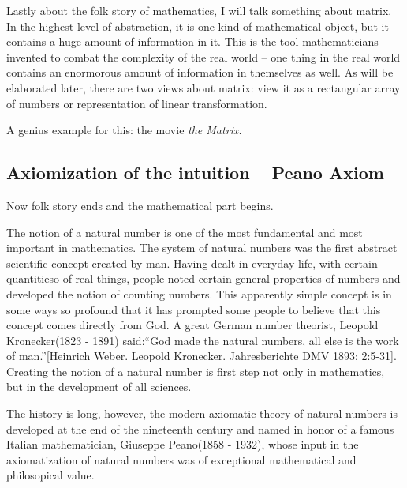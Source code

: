 \documentclass[a4paper]{book}
\begin{document}
    Lastly about the folk story of mathematics, I will talk something
    about matrix. In the highest level of abstraction, it is one kind
    of mathematical object, but it contains a huge amount of
    information in it. This is the tool mathematicians invented to
    combat the complexity of the real world -- one thing in the real
    world contains an enormorous amount of information in themselves as
    well. As will be elaborated later, there are two views about matrix:
    view it as a rectangular array of numbers or representation of
    linear transformation.

    A genius example for this: the movie \textit{the Matrix.}


    \subsection{Axiomization of the intuition -- Peano Axiom}

    Now folk story ends and the mathematical part begins.

    The notion of a natural number is one of the most fundamental and most
    important in mathematics. The system of natural numbers was the first
    abstract scientific concept created by man. Having dealt in everyday
    life, with certain quantitieso of real things, people noted certain
    general properties of numbers and developed the notion of counting
    numbers. This apparently simple concept is in some ways so profound that
    it has prompted some people to believe that this concept comes directly
    from God. A great German number theorist, Leopold Kronecker(1823 - 1891)
    said:``God made the natural numbers, all else is the work of
    man.''[Heinrich Weber. Leopold Kronecker. Jahresberichte DMV 1893;
    2:5-31]. Creating the notion of a natural number is first step not only
    in mathematics, but in the development of all
    sciences\cite{dixon2011algebra}.

    The history is long, however, the modern axiomatic theory of natural
    numbers is developed at the end of the nineteenth century and named in
    honor of a famous Italian mathematician, Giuseppe Peano(1858 - 1932),
    whose input in the axiomatization of natural numbers was of exceptional
    mathematical and philosopical value\cite{dixon2011algebra}.
\end{document}
